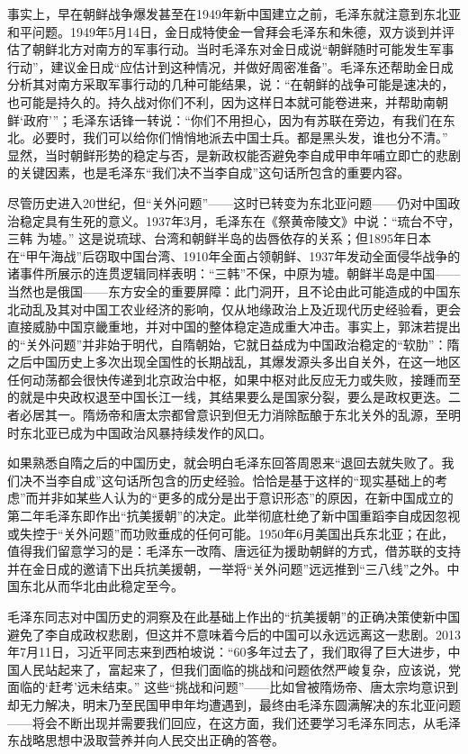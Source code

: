 \documentclass[UTF8, 12pt, a4paper]{ctexrep}
\begin{document}
事实上，早在朝鲜战争爆发甚至在1949年新中国建立之前，毛泽东就注意到东北亚和平问题。1949年5月14日，金日成特使金一曾拜会毛泽东和朱德，双方谈到并评估了朝鲜北方对南方的军事行动。当时毛泽东对金日成说“朝鲜随时可能发生军事行动”，建议金日成“应估计到这种情况，并做好周密准备”。毛泽东还帮助金日成分析其对南方采取军事行动的几种可能结果，说：“在朝鲜的战争可能是速决的，也可能是持久的。持久战对你们不利，因为这样日本就可能卷进来，并帮助南朝鲜‘政府’”；毛泽东话锋一转说：“你们不用担心，因为有苏联在旁边，有我们在东北。必要时，我们可以给你们悄悄地派去中国士兵。都是黑头发，谁也分不清。” 显然，当时朝鲜形势的稳定与否，是新政权能否避免李自成甲申年哺立即亡的悲剧的关键因素，也是毛泽东“我们决不当李自成”这句话所包含的重要内容。

尽管历史进入20世纪，但“关外问题”——这时已转变为东北亚问题——仍对中国政治稳定具有生死的意义。1937年3月，毛泽东在《祭黄帝陵文》中说：“琉台不守，三韩 为墟。” 这是说琉球、台湾和朝鲜半岛的齿唇依存的关系；但1895年日本在“甲午海战”后窃取中国台湾、1910年全面占领朝鲜、1937年发动全面侵华战争的诸事件所展示的连贯逻辑同样表明：“三韩”不保，中原为墟。朝鲜半岛是中国——当然也是俄国——东方安全的重要屏障：此门洞开，且不论由此可能造成的中国东北动乱及其对中国工农业经济的影响，仅从地缘政治上及近现代历史经验看，更会直接威胁中国京畿重地，并对中国的整体稳定造成重大冲击。事实上，郭沫若提出的“关外问题”并非始于明代，自隋朝始，它就日益成为中国政治稳定的“软肋”：隋之后中国历史上多次出现全国性的长期战乱，其爆发源头多出自关外，在这一地区任何动荡都会很快传递到北京政治中枢，如果中枢对此反应无力或失败，接踵而至的就是中央政权退至中国长江一线，其结果要么是国家分裂，要么是政权更迭。二者必居其一。隋炀帝和唐太宗都曾意识到但无力消除酝酿于东北关外的乱源，至明时东北亚已成为中国政治风暴持续发作的风口。

如果熟悉自隋之后的中国历史，就会明白毛泽东回答周恩来“退回去就失败了。我们决不当李自成”这句话所包含的历史经验。恰恰是基于这样的“现实基础上的考虑”而并非如某些人认为的“更多的成分是出于意识形态”的原因，在新中国成立的第二年毛泽东即作出“抗美援朝”的决定。此举彻底杜绝了新中国重蹈李自成因忽视或失控于“关外问题”而功败垂成的任何可能。1950年6月美国出兵东北亚；在此，值得我们留意学习的是：毛泽东一改隋、唐远征为援助朝鲜的方式，借苏联的支持并在金日成的邀请下出兵抗美援朝，一举将“关外问题”远远推到“三八线”之外。中国东北从而华北由此稳定至今。

毛泽东同志对中国历史的洞察及在此基础上作出的“抗美援朝”的正确决策使新中国避免了李自成政权悲剧，但这并不意味着今后的中国可以永远远离这一悲剧。2013年7月11日，习近平同志来到西柏坡说：“60多年过去了，我们取得了巨大进步，中国人民站起来了，富起来了，但我们面临的挑战和问题依然严峻复杂，应该说，党面临的‘赶考’远未结束。” 这些“挑战和问题”——比如曾被隋炀帝、唐太宗均意识到却无力解决，明末乃至民国甲申年均遭遇到，最终由毛泽东圆满解决的东北亚问题——将会不断出现并需要我们回应，在这方面，我们还要学习毛泽东同志，从毛泽东战略思想中汲取营养并向人民交出正确的答卷。
\end{document}
